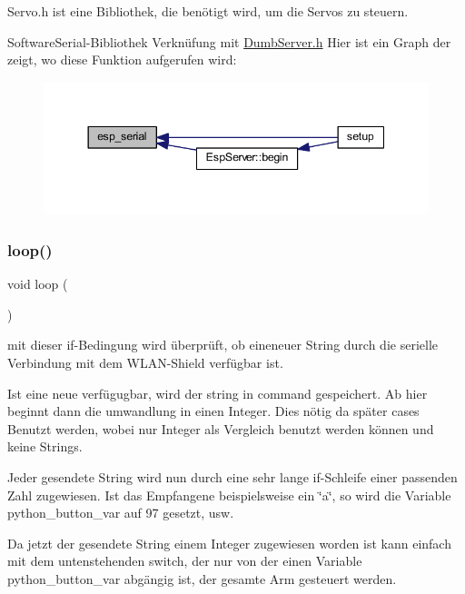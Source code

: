 Servo.\+h ist eine Bibliothek, die benötigt wird, um die Servos zu steuern. 

Software\+Serial-\/\+Bibliothek Verknüfung mit \hyperlink{_dumb_server_8h}{Dumb\+Server.\+h} Hier ist ein Graph der zeigt, wo diese Funktion aufgerufen wird\+:\nopagebreak
\begin{figure}[H]
\begin{center}
\leavevmode
\includegraphics[width=344pt]{_arduino__kommentiert_8ino_af690b3a6882292855c4091ede8039998_icgraph}
\end{center}
\end{figure}
\mbox{\label{_arduino__kommentiert_8ino_afe461d27b9c48d5921c00d521181f12f}} 
\subsubsection{\texorpdfstring{loop()}{loop()}}
{\footnotesize\ttfamily void loop (\begin{DoxyParamCaption}{ }\end{DoxyParamCaption})}

mit dieser if-\/\+Bedingung wird überprüft, ob eineneuer String durch die serielle Verbindung mit dem W\+L\+A\+N-\/\+Shield verfügbar ist.

Ist eine neue verfügugbar, wird der string in command gespeichert. Ab hier beginnt dann die umwandlung in einen Integer. Dies nötig da später cases Benutzt werden, wobei nur Integer als Vergleich benutzt werden können und keine Strings.

Jeder gesendete String wird nun durch eine sehr lange if-\/\+Schleife einer passenden Zahl zugewiesen. Ist das Empfangene beispielsweise ein \char`\"{}a\char`\"{}, so wird die Variable python\+\_\+button\+\_\+var auf 97 gesetzt, usw.

Da jetzt der gesendete String einem Integer zugewiesen worden ist kann einfach mit dem untenstehenden switch, der nur von der einen Variable python\+\_\+button\+\_\+var abgängig ist, der gesamte Arm gesteuert werden.

